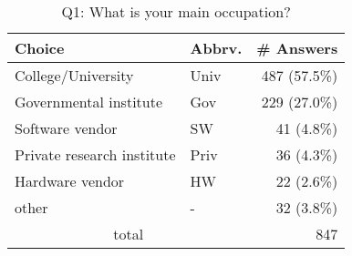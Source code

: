 \begin{table}[htb]%
\begin{center}%
\caption{Q1: What is your main occupation?}%
\label{tab:Q1-ans}%
\begin{tabular}{l|l|r}%
\hline%
Choice & Abbrv. & \# Answers \\%
\hline%
College/University & Univ & 487 (57.5\%) \\%
Governmental institute & Gov & 229 (27.0\%) \\%
Software vendor & SW & 41 (4.8\%) \\%
Private research institute & Priv & 36 (4.3\%) \\%
Hardware vendor & HW & 22 (2.6\%) \\%
other & - & 32 (3.8\%) \\%
\hline%
\multicolumn{2}{c}{total} & 847 \\%
\hline%
\end{tabular}%
\end{center}%
\end{table}%
